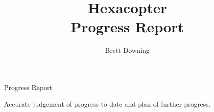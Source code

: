 \documentclass[11pt]{article}
\title{Hexacopter\\
	Progress Report}
\author{Brett Downing}
\date{}
\begin{document}
  \maketitle

Progress Report

Accurate judgement of progress to date and plan of further progress.

	
\end{document}
